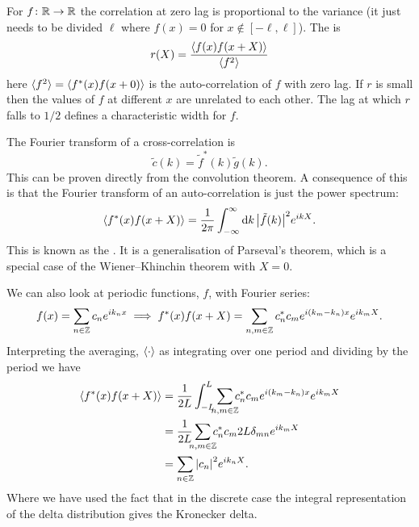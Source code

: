 \documentclass[a4paper]{article}
\begin{document}
    For \(f\colon\mathbb{R}\to\mathbb{R}\) the correlation at zero lag is proportional to the variance (it just needs to be divided \(\ell\) where \(f(x) = 0\) for \(x\notin[-\ell, \ell]\)).
    The  is
    \[r(X) = \frac{\langle{f(x)f(x + X)}\rangle}{\langle{f^2}\rangle}\]
    here \(\langle{f^2}\rangle = \langle{f^*(x)f(x + 0)}\rangle\) is the auto-correlation of \(f\) with zero lag.
    If \(r\) is small then the values of \(f\) at different \(x\) are unrelated to each other.
    The lag at which \(r\) falls to \(1/2\) defines a characteristic width for \(f\).
    
    The Fourier transform of a cross-correlation is
    \[\tilde{c}(k) = \tilde{f}^*(k)\tilde{g}(k).\]
    This can be proven directly from the convolution theorem.
    A consequence of this is that the Fourier transform of an auto-correlation is just the power spectrum:
    \[\langle{f^*(x)f(x + X)}\rangle = \frac{1}{2\pi}\int_{-\infty}^{\infty} \dd{k} \abs{\tilde{f}(k)}^2e^{ikX}.\]
    This is known as the .
    It is a generalisation of Parseval's theorem, which is a special case of the Wiener--Khinchin theorem with \(X = 0\).
    
    We can also look at periodic functions, \(f\), with Fourier series:
    \[f(x) = \sum_{n\in\mathbb{Z}} c_ne^{ik_nx} \implies f^*(x)f(x + X) = \sum_{n,m\in\mathbb{Z}}c_n^*c_me^{i(k_m - k_n)x}e^{ik_mX}.\]
    Interpreting the averaging, \(\langle{\cdot}\rangle\) as integrating over one period and dividing by the period we have
    \begin{align*}
        \expected{f^*(x)f(x + X)} &= \frac{1}{2L}\int_{-L}^{L} \sum_{\mathclap{n,m\in\integers}}c_n^*c_me^{i(k_m - k_n)x}e^{ik_mX}\\
        &= \frac{1}{2L}\sum_{\mathclap{n, m\in\integers}}c_n^*c_m2L\delta_{mn}e^{ik_mX}\\
        &= \sum_{n\in\integers} \abs{c_n}^2e^{ik_nX}.
    \end{align*}
    Where we have used the fact that in the discrete case the integral representation of the delta distribution gives the Kronecker delta.
    
\end{document}
